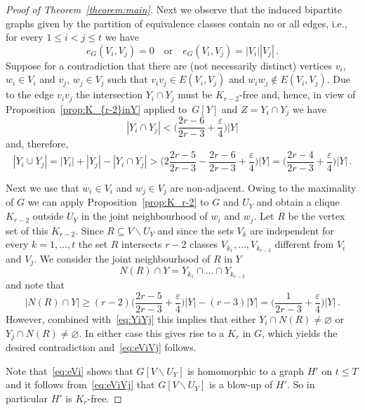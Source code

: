 \documentclass[reqno, 12pt]{amsart}
\theoremstyle{plain}
\theoremstyle{definition}
\let\eps=\varepsilon
\let\setminus=\smallsetminus
\let\emptyset=\varnothing
\begin{document}
\begin{proof}[Proof of Theorem~\ref{theorem:main}]
	Next we observe that the induced bipartite graphs given by the partition of equivalence classes 
	contain no or all edges, i.e.,
	for every $1\leq i<j\leq t$ we have 
	\begin{equation}\label{eq:eViVj} 
		e_G(V_i,V_j)=0\quad \text{or}\quad e_G(V_i,V_j)=|V_i||V_j|\,.
	\end{equation}
	Suppose for a contradiction that there are (not necessarily distinct) vertices $v_i$, $w_i\in V_i$ and 
	$v_j$, $w_j\in V_j$ such that $v_iv_j\in E(V_i,V_j)$ and $w_iw_j\not\in	E(V_i,V_j)$.
	Due to the edge $v_iv_j$ the intersection $Y_i\cap Y_j$ must be $K_{r-2}$-free and, hence, 
	in view of Proposition~\ref{prop:K_{r-2}inY} applied to~$G[Y]$ and $Z=Y_i\cap Y_j$
	we have 
	\[
		|Y_i\cap Y_j|<\Big(\frac{2r-6}{2r-3}+\frac{\eps}{4}\Big)|Y|
	\]
	and, therefore,
	\begin{equation}\label{eq:YiYj}
		|Y_i\cup Y_j|
		= 
		|Y_i|+|Y_j|-|Y_i\cap Y_j| 
		>
		\Big(2\frac{2r-5}{2r-3}-\frac{2r-6}{2r-3}+\frac{\eps}{4}\Big)|Y|
		=
		\Big(\frac{2r-4}{2r-3}+\frac{\eps}{4}\Big)|Y|\,.
	\end{equation}
	
	Next we use that $w_i\in V_i$ and $w_j\in V_j$ are non-adjacent.
	Owing to the maximality of $G$ we can apply Proposition~\ref{prop:K_r-2}
	to $G$ and $U_Y$ and obtain a clique $K_{r-2}$ outside $U_Y$ in the joint 
	neighbourhood of $w_i$ and $w_j$. Let $R$ be the vertex set of this $K_{r-2}$.
	Since $R\subseteq V\setminus U_Y$ and since the sets $V_k$ are independent for every 
	$k=1,\dots,t$ the set $R$ intersects $r-2$ classes $V_{k_1},\dots, V_{k_{r-2}}$
	different from $V_i$ and $V_j$. We consider the joint neighbourhood of $R$ in $Y$ 
	\[
		N(R)\cap Y = Y_{k_1}\cap\dots\cap Y_{k_{r-2}}
	\]
	and note that 
	\[
		|N(R)\cap Y|\geq (r-2)\Big(\frac{2r-5}{2r-3}+\frac{\eps}{4}\Big)|Y|-(r-3)|Y|=\Big(\frac{1}{2r-3}+\frac{\eps}{4}\Big)|Y|\,.
	\]
	However, combined with~\eqref{eq:YiYj} this implies that either $Y_i\cap N(R)\neq \emptyset$ or $Y_j\cap N(R)\neq \emptyset$.
	In either case this gives rise to a $K_r$ in $G$, which yields the desired contradiction and~\eqref{eq:eViVj} follows.
	
	Note that~\eqref{eq:eVi} shows that $G[V\setminus U_Y]$ is 
	homomorphic to a graph $H'$ on $t\leq T$ and it follows from~\eqref{eq:eViVj} 
	that $G[V\setminus U_Y]$ is a blow-up of $H'$. So in particular $H'$ is $K_r$-free.
	

\end{proof}
\end{document}
